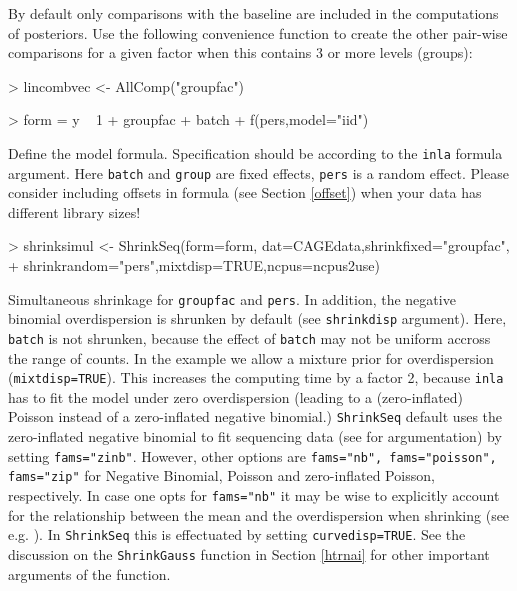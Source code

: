 \documentclass[11pt]{article}
\newcommand{\para}{\bigskip\noindent}
\begin{document}
\para
By default only comparisons with the baseline are included in the computations of posteriors. Use the following convenience function to create the other
pair-wise comparisons for a given factor when this contains 3 or more levels (groups):
\begin{Schunk}
\begin{Sinput}
> lincombvec <- AllComp("groupfac")
\end{Sinput}
\end{Schunk}

\begin{Schunk}
\begin{Sinput}
> form = y ~ 1 + groupfac + batch + f(pers,model="iid")
\end{Sinput}
\end{Schunk}
Define the model formula. Specification should be according to the {\tt inla} formula argument.
Here {\tt batch} and {\tt group} are fixed effects, {\tt pers} is a random effect. Please consider
including offsets in formula (see Section \ref{offset}) when your data has different library sizes!


\begin{Schunk}
\begin{Sinput}
> shrinksimul <- ShrinkSeq(form=form, dat=CAGEdata,shrinkfixed="groupfac",
+ shrinkrandom="pers",mixtdisp=TRUE,ncpus=ncpus2use)
\end{Sinput}
\end{Schunk}
Simultaneous shrinkage for {\tt groupfac} and {\tt pers}. In addition, the negative binomial overdispersion is shrunken
by default (see {\tt shrinkdisp} argument). Here, {\tt batch} is not shrunken, because the effect of {\tt batch} may not be uniform accross
the range of counts.
In the example we allow a mixture prior for overdispersion ({\tt mixtdisp=TRUE}). This increases the computing time by a factor 2,
because {\tt inla} has to fit the model under zero overdispersion (leading to a (zero-inflated) Poisson instead of a
zero-inflated negative binomial.) {\tt ShrinkSeq} default uses the zero-inflated negative binomial to fit sequencing data (see
\cite[]{WielShrinkSeq} for argumentation) by setting {\tt fams="zinb"}. However, other options are {\tt fams="nb", fams="poisson", fams="zip"} for
Negative Binomial, Poisson and zero-inflated Poisson, respectively. In case one opts for {\tt fams="nb"} it may be wise to
explicitly account for the relationship between the mean and the overdispersion when shrinking (see e.g. \cite[]{Huber2010}).
In {\tt ShrinkSeq} this is effectuated by setting {\tt curvedisp=TRUE}.
See the discussion on the {\tt ShrinkGauss} function in Section \ref{htrnai} for other important arguments of the function.
\end{document}
